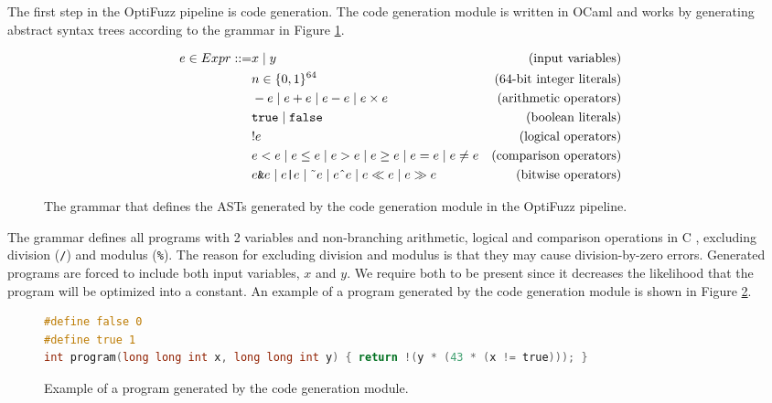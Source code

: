 \label{sec:code-generation}
The first step in the OptiFuzz pipeline is code generation. 
The code generation module is written in OCaml and works by generating abstract syntax trees according to the grammar in Figure \ref{fig:grammar}.

\begin{figure}[H]
  \centering
  \begin{align*}
    e \in Expr ::= & x \mid y &\text{(input variables)}\\
    & n \in \{0, 1\}^{64} &\text{(64-bit integer literals)}\\
    & -e \mid e + e \mid e - e \mid e \times e &\text{(arithmetic operators)}\\
    & \texttt{true} \mid \texttt{false} &\text{(boolean literals)}\\
    & !e &\text{(logical operators)}\\
    & e < e \mid e \leq e \mid e > e \mid e \geq e \mid e = e \mid e \neq e &\text{(comparison operators)}\\
    & e \texttt{\&} e \mid e \texttt{|} e \mid \text{\~{}} e \mid e \text{\^{}} e \mid e \ll e \mid e \gg e &\text{(bitwise operators)}
  \end{align*}
  \caption{The grammar that defines the ASTs generated by the code generation module in the OptiFuzz pipeline.}
  \label{fig:grammar}
\end{figure}

The grammar defines all programs with 2 variables and non-branching arithmetic, logical and comparison operations in C \citep{c-standard}, excluding division (\texttt{/}) and modulus (\texttt{\%}).
The reason for excluding division and modulus is that they may cause division-by-zero errors.
Generated programs are forced to include both input variables, $x$ and $y$.
We require both to be present since it decreases the likelihood that the program will be optimized into a constant.
An example of a program generated by the code generation module is shown in Figure \ref{fig:code-gen-example}.

\begin{figure}[H]
  \begin{lstlisting}[style=defstyle,language=C, xleftmargin=0.9cm, xrightmargin=0.9cm, basicstyle=\footnotesize\ttfamily,breaklines=true]
#define false 0
#define true 1
int program(long long int x, long long int y) { return !(y * (43 * (x != true))); } \end{lstlisting}
  \caption{Example of a program generated by the code generation module.}
  \label{fig:code-gen-example}
\end{figure}

